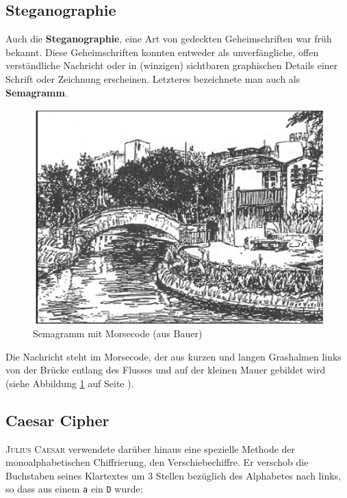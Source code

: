 \documentclass[%
11pt,%
twoside,%
titlepage,%
german,%
headsepline%
]{scrartcl}
\begin{document}
\subsection{Steganographie}

Auch die \textbf{Steganographie}, eine Art von gedeckten Geheimschriften war früh bekannt. Diese Geheimschriften konnten entweder als unverfängliche, offen verständliche Nachricht oder in (winzigen) sichtbaren graphischen Details einer Schrift oder Zeichnung erscheinen. Letzteres bezeichnete man auch als \textbf{Semagramm}.

\begin{figure}
\begin{center}
\includegraphics[width=1.2\textwidth, angle=90]{pictures/semabauer.jpg}
\caption{Semagramm mit Morsecode (aus Bauer)}\label{semagramm}
\end{center}
\end{figure}

Die Nachricht steht im Morsecode, der aus kurzen und langen Grashalmen links von der Brücke entlang des Flusses und auf der kleinen Mauer gebildet wird (siehe Abbildung \ref{semagramm} auf Seite \pageref{semagramm}).

\subsection{Caesar Cipher}

\textsc{Julius Caesar}
verwendete darüber hinaus eine spezielle Methode der monoalphabetischen Chiffrierung, den Verschiebechiffre. Er verschob die Buchstaben seines Klartextes um 3 Stellen bezüglich des Alphabetes nach links, so dass aus einem \texttt{a} ein \texttt{D} wurde:\\
\end{document}
